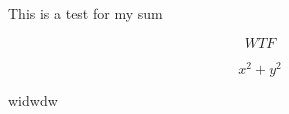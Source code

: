 
This is a test for my sum 

\begin{equation}
    WTF
\end{equation}	


\begin{equation}
    x^2 + y^2
\end{equation}


\begin{test}
   widwdw 
\end{test}
